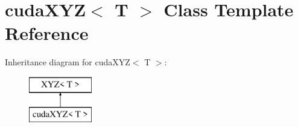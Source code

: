 \hypertarget{classcudaXYZ}{}\section{cuda\+X\+YZ$<$ T $>$ Class Template Reference}
\label{classcudaXYZ}
Inheritance diagram for cuda\+X\+YZ$<$ T $>$\+:\begin{figure}[H]
\begin{center}
\leavevmode
\includegraphics[height=2.000000cm]{classcudaXYZ}
\end{center}
\end{figure}
